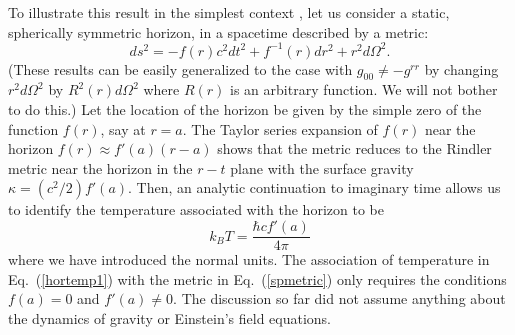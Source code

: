 \documentclass[12pt]{iopart}
\def\eq#1{{Eq.~(\ref{#1})}}
\begin{document}
 To illustrate this result in the simplest context \cite{tdsingr}, let us consider 
 a static, spherically symmetric horizon, in a spacetime described by a metric:
\begin{equation}
ds^2 = -f(r) c^2 dt^2 + f^{-1}(r) dr^2 + r^2 d\Omega^2. \label{spmetric}
\end{equation}
(These results can be easily generalized to the case with $g_{00} \ne - g^{rr}$ 
by changing $r^2 d\Omega^2 $ by $R^2(r) d \Omega^2$ where $R(r)$ is an arbitrary function. We will not bother to do this.)
Let the location of  the horizon be given by the simple zero of the function $f(r)$, say at $r=a$. The Taylor series expansion of $f(r)$ near the horizon $f(r)\approx f'(a)(r-a)$ shows that the metric reduces to the Rindler metric near the horizon in the $r-t$ plane  with the surface gravity $\kappa = (c^2/2) f'(a)$. Then, an analytic continuation to imaginary time allows us to identify the temperature associated with the horizon to be 
\begin{equation}
k_BT=\frac{\hbar c f'(a)}{4\pi}
\label{hortemp1}
\end{equation} 
where we have introduced the normal units. 
The association of temperature in \eq{hortemp1} with the metric in \eq{spmetric} only requires the conditions $f(a)=0$ and $f'(a)\ne 0$.
The discussion so far did not assume anything about the dynamics of gravity or Einstein's field equations.  
\end{document}
